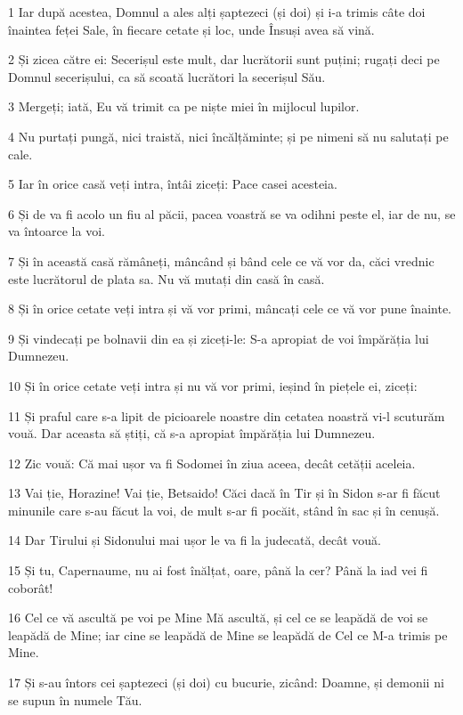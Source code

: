 \par 1 Iar după acestea, Domnul a ales alți șaptezeci (și doi) și i-a trimis câte doi înaintea feței Sale, în fiecare cetate și loc, unde Însuși avea să vină.
\par 2 Și zicea către ei: Secerișul este mult, dar lucrătorii sunt puțini; rugați deci pe Domnul secerișului, ca să scoată lucrători la secerișul Său.
\par 3 Mergeți; iată, Eu vă trimit ca pe niște miei în mijlocul lupilor.
\par 4 Nu purtați pungă, nici traistă, nici încălțăminte; și pe nimeni să nu salutați pe cale.
\par 5 Iar în orice casă veți intra, întâi ziceți: Pace casei acesteia.
\par 6 Și de va fi acolo un fiu al păcii, pacea voastră se va odihni peste el, iar de nu, se va întoarce la voi.
\par 7 Și în această casă rămâneți, mâncând și bând cele ce vă vor da, căci vrednic este lucrătorul de plata sa. Nu vă mutați din casă în casă.
\par 8 Și în orice cetate veți intra și vă vor primi, mâncați cele ce vă vor pune înainte.
\par 9 Și vindecați pe bolnavii din ea și ziceți-le: S-a apropiat de voi împărăția lui Dumnezeu.
\par 10 Și în orice cetate veți intra și nu vă vor primi, ieșind în piețele ei, ziceți:
\par 11 Și praful care s-a lipit de picioarele noastre din cetatea noastră vi-l scuturăm vouă. Dar aceasta să știți, că s-a apropiat împărăția lui Dumnezeu.
\par 12 Zic vouă: Că mai ușor va fi Sodomei în ziua aceea, decât cetății aceleia.
\par 13 Vai ție, Horazine! Vai ție, Betsaido! Căci dacă în Tir și în Sidon s-ar fi făcut minunile care s-au făcut la voi, de mult s-ar fi pocăit, stând în sac și în cenușă.
\par 14 Dar Tirului și Sidonului mai ușor le va fi la judecată, decât vouă.
\par 15 Și tu, Capernaume, nu ai fost înălțat, oare, până la cer? Până la iad vei fi coborât!
\par 16 Cel ce vă ascultă pe voi pe Mine Mă ascultă, și cel ce se leapădă de voi se leapădă de Mine; iar cine se leapădă de Mine se leapădă de Cel ce M-a trimis pe Mine.
\par 17 Și s-au întors cei șaptezeci (și doi) cu bucurie, zicând: Doamne, și demonii ni se supun în numele Tău.
